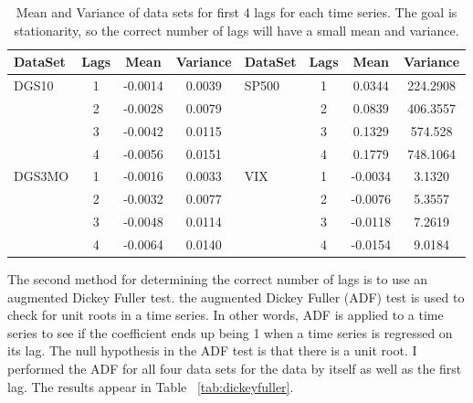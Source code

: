 \documentclass[a4paper, 11pt]{article}
\theoremstyle{definition} %
\numberwithin{equation}{section}
\begin{document}
      \begin{table}
        \begin{centering}
        \begin{tabular}{|l|c|cc||l|c|cc|}
          \hline
           \rowcolor{gray!45} DataSet & Lags &   Mean &     Variance & DataSet & Lags &   Mean &     Variance \\
          \hline
          \hline
           \rowcolor{gray!7} DGS10  & 1    & -0.0014 &  0.0039 & SP500  & 1    &   0.0344 &  224.2908 \\
           \rowcolor{gray!23} {} &     2    & -0.0028 &  0.0079 & {} &     2    &   0.0839 &  406.3557 \\
           \rowcolor{gray!7} {} &     3    &  -0.0042 &   0.0115 & {} &      3    &    0.1329 &   574.528 \\
           \rowcolor{gray!23} {} &     4    & -0.0056 &   0.0151 & {} &     4    &    0.1779 &  748.1064 \\
           \rowcolor{gray!7} DGS3MO &  1    & -0.0016 &  0.0033 & VIX    & 1    & -0.0034 &   3.1320 \\
           \rowcolor{gray!23} {} &     2    & -0.0032 &  0.0077 & {} &     2    & -0.0076 &  5.3557 \\
           \rowcolor{gray!7} {} &     3    &  -0.0048 &   0.0114 & {} &     3    &  -0.0118 &  7.2619 \\
           \rowcolor{gray!23} {} &     4    & -0.0064 &   0.0140 & {} &     4    &  -0.0154 &  9.0184 \\
          \hline
        \end{tabular}
        \captionsetup{width=5.5in}
        \caption{Mean and Variance of data sets for first 4 lags for each time series. The goal is stationarity, so the correct number of lags will have a small mean and variance.}
        \label{tab:differences}
        \end{centering}
      \end{table}

      The second method for determining the correct number of lags is to use an augmented Dickey Fuller test.  the augmented Dickey Fuller (ADF) test is used to check for unit roots in a time series. In other words, ADF is applied to a time series to see if the coefficient ends up being 1 when a time series is regressed on its lag. The null hypothesis in the ADF test is that there is a unit root. I performed the ADF for all four data sets for the data by itself as well as the first lag. The results appear in Table ~\ref{tab:dickeyfuller}.
\end{document}
